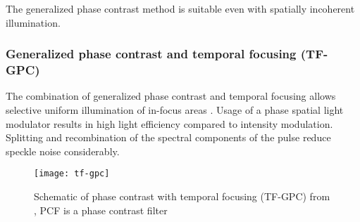 The generalized phase contrast method is suitable even with spatially
incoherent illumination.
\subsubsection{Generalized phase contrast and temporal focusing (TF-GPC)}
The combination of generalized phase contrast and temporal focusing
allows selective uniform illumination of in-focus areas
\citep{Papagiakoumou2010}. Usage of a phase spatial light modulator
results in high light efficiency compared to intensity modulation.
Splitting and recombination of the spectral components of the pulse
reduce speckle noise considerably.
\begin{figure}[!hbt]
  \centering
  \texttt{[image: tf-gpc]} 
  \caption{Schematic of phase contrast with temporal focusing (TF-GPC)
    from \citep{Papagiakoumou2010}, PCF is a phase contrast filter}
  \label{fig:tf-gpc}
\end{figure}

